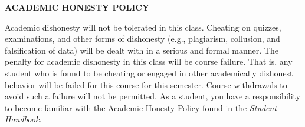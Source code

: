 \documentclass{article}
\begin{document}
\begin{center}
{\bf ACADEMIC HONESTY POLICY}
\end{center} 
Academic dishonesty will not be tolerated in this class. Cheating
on quizzes, examinations, and other forms of dishonesty (e.g., plagiarism, collusion, and
falsification of data) will be dealt with in a serious and formal manner. The penalty for academic
dishonesty in this class will be course failure. That is, any student who is found to be cheating
or engaged in other academically dishonest behavior will be failed for this course for this
semester. Course withdrawals to avoid such a failure will not be permitted. As a student, you
have a responsibility to become familiar with the Academic Honesty Policy found in the {\it Student
 Handbook}.\\
\\
\\
\end{document}
